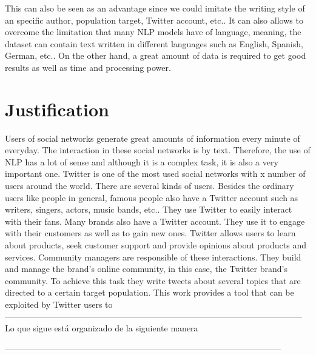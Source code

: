 This can also be seen as an advantage since  we could imitate the writing style of an specific author, population target, Twitter account, etc.. It can also allows to overcome the limitation that many NLP models have of language, meaning, the dataset can contain text written in different languages such as English, Spanish, German, etc.. On the other hand, a great amount of data is required to get good results as well as time and processing power. 

\section{Justification}

Users of  social networks generate great amounts of information every minute of everyday. The interaction in these social networks is by text. Therefore, the use of NLP has a lot of sense and although it is a complex task, it is also a very important one.
Twitter is one of the most used social networks with x number of users around the world.  There are several kinds of users. Besides the ordinary users like people in general, famous people also have a Twitter account such as writers, singers, actors, music bands, etc.. They use Twitter to easily interact with their fans.  Many brands also have  a Twitter account. They use it to engage with their customers as well as to gain new ones. Twitter allows users to learn about products, seek customer support and provide opinions about products and services. Community managers are responsible of these interactions. They build and manage the brand's online community, in this case, the Twitter brand's community. To achieve this task they write tweets about several topics that are directed to a certain target population. This work provides a tool that can be exploited by Twitter users  to 
---------------------------------------------------------------------------------------------------------
Lo que sigue está organizado de la siguiente manera

--------------------------------------------------------------------------------------------------

